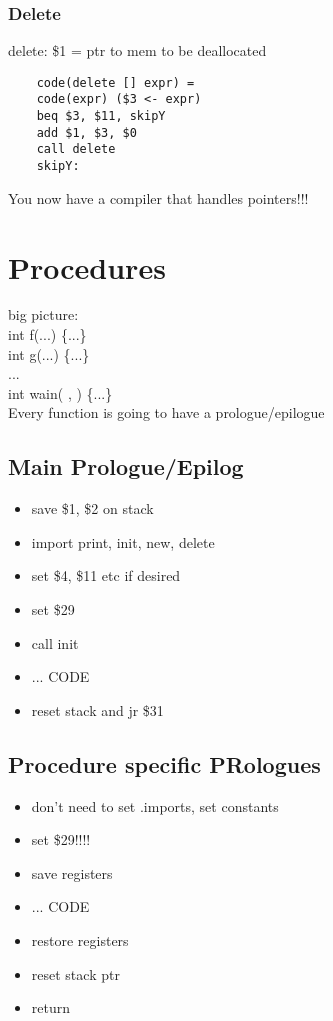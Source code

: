 \documentclass[12pt]{article}
\begin{document}
	\subsubsection*{Delete}
	delete: \$1 = ptr to mem to be deallocated\\
	\begin{verbatim}
	code(delete [] expr) = 
	code(expr) ($3 <- expr)
	beq $3, $11, skipY
	add $1, $3, $0
	call delete
	skipY:
	\end{verbatim}
	
	You now have a compiler that handles pointers!!!\\
	
	\section*{Procedures}
	big picture:\\
	int f(...) \{...\}\\
	int g(...) \{...\}\\
	...\\
	int wain( , ) \{...\}\\
	
	Every function is going to have a prologue/epilogue\\
	
	\subsection*{Main Prologue/Epilog}
	\begin{itemize}
		\item save \$1, \$2 on stack
		\item import print, init, new, delete
		\item set \$4, \$11 etc if desired
		\item set \$29
		\item call init
		\item ... CODE
		\item reset stack and jr \$31
	\end{itemize}
	
	\subsection*{Procedure specific PRologues}
	\begin{itemize}
		\item don't need to set .imports, set constants
		\item set \$29!!!!
		\item save registers
		\item ... CODE
		\item restore registers
		\item reset stack ptr
		\item return
	\end{itemize}
	
\end{document}
